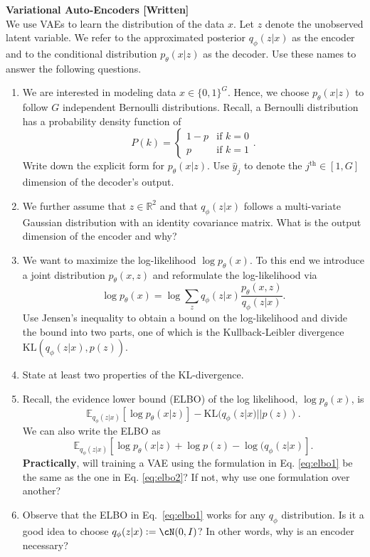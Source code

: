 \begin{Q}
\textbf{\Large Variational Auto-Encoders [Written]}\\
We use VAEs to learn the distribution of the data $x$. Let $z$ denote the
unobserved latent variable. We refer to the approximated posterior $q_\phi(z|x)$ as the encoder
and to the conditional distribution $p_\theta(x|z)$ as the decoder. Use these names to answer
the following questions.
\begin{enumerate}
\item We are interested in modeling data $x \in \{0,1\}^{G}$. Hence, we choose $p_\theta(x|z)$ to follow $G$ independent Bernoulli distributions. Recall, a Bernoulli distribution has a probability density function of 
$$
    P(k)= 
\begin{cases}
    1-p & \text{if } k = 0\\
    p    & \text{if } k = 1
\end{cases}.
$$
Write down the explicit form for $p_\theta(x|z)$. Use $\hat{y}_j$ to denote the $j^\text{th}\in[1,G]$ dimension of the decoder's output.
\item We further assume that $z \in \mathbb{R}^{2}$ and that $q_\phi(z|x)$ follows a multi-variate Gaussian distribution with an identity covariance matrix. What is the output dimension of the encoder and why?

\item  We want to maximize the log-likelihood $\log p_\theta(x)$. To this end we introduce a joint distribution $p_\theta(x,z)$ and reformulate the log-likelihood via
$$
\log p_\theta(x) = \log \sum_z q_{\phi}(z|x) \frac{p_\theta(x,z)}{q_{\phi}(z|x)}.
$$
Use Jensen's inequality to obtain a bound on the log-likelihood and divide the bound into two parts, one of which is the Kullback-Leibler divergence $\text{KL}(q_{\phi}(z|x), p(z)).$

\item State at least two properties of the KL-divergence.


\item Recall, the evidence lower bound (ELBO) of the log likelihood, $\log p_{\theta}(x)$, is 
\begin{equation}\label{eq:elbo1}
\mathbb{E}_{q_\phi(z|x)} [\log p_\theta(x|z)] - \text{KL}(q_\phi(z|x) || p(z)).
\end{equation}
We can also write the ELBO as
\begin{equation}
\mathbb{E}_{q_\phi(z|x)} [\log p_\theta(x|z) + \log p(z) - \log(q_\phi(z|x)].
\label{eq:elbo2}
\end{equation}
{\bf Practically}, will training a VAE using the formulation in Eq. \ref{eq:elbo1} be the same as the one in Eq. \ref{eq:elbo2}? If not, why use one formulation over another?
\item Observe that the ELBO in Eq.~\ref{eq:elbo1} works for any $q_\phi$ distribution. Is it a good idea to choose $q_\phi(z|x) := \cN(0, I)$? In other words, why is an encoder necessary?



\end{enumerate}
\end{Q}
